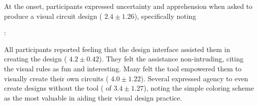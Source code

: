 \documentclass{sigchi}
\begin{document}
  At the onset, participants expressed uncertainty and apprehension when asked to produce a visual circuit design ( $2.4 \pm 1.26$), specifically noting 
  \begin{myquote}
   \vspace{-2pt}
    :
    \vspace{-2pt}
  \end{myquote}
  All participants reported feeling that the design interface assisted them in creating the design ( $4.2 \pm 0.42$). They felt the assistance non-intruding, citing the visual rules as fun and interesting. 
  Many felt the tool empowered them to visually create their own circuits ( $4.0 \pm 1.22$). Several expressed agency to even create designs without the tool ( of $3.4 \pm 1.27$), noting the simple coloring scheme as the most valuable in aiding their visual design practice.
\end{document}
